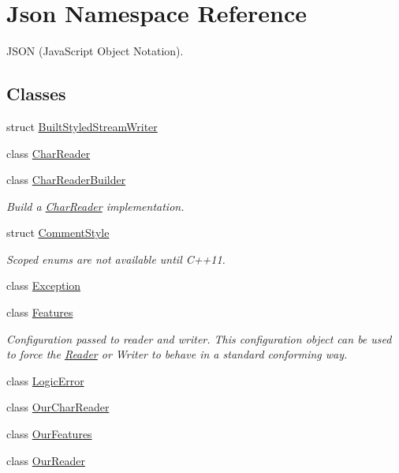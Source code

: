 \hypertarget{namespaceJson}{}\section{Json Namespace Reference}
\label{namespaceJson}


J\+S\+ON (Java\+Script Object Notation).  


\subsection*{Classes}
\begin{DoxyCompactItemize}
\item 
struct \hyperlink{structJson_1_1BuiltStyledStreamWriter}{Built\+Styled\+Stream\+Writer}
\item 
class \hyperlink{classJson_1_1CharReader}{Char\+Reader}
\item 
class \hyperlink{classJson_1_1CharReaderBuilder}{Char\+Reader\+Builder}
\begin{DoxyCompactList}\small\item\em Build a \hyperlink{classJson_1_1CharReader}{Char\+Reader} implementation. \end{DoxyCompactList}\item 
struct \hyperlink{structJson_1_1CommentStyle}{Comment\+Style}
\begin{DoxyCompactList}\small\item\em Scoped enums are not available until C++11. \end{DoxyCompactList}\item 
class \hyperlink{classJson_1_1Exception}{Exception}
\item 
class \hyperlink{classJson_1_1Features}{Features}
\begin{DoxyCompactList}\small\item\em Configuration passed to reader and writer. This configuration object can be used to force the \hyperlink{classJson_1_1Reader}{Reader} or Writer to behave in a standard conforming way. \end{DoxyCompactList}\item 
class \hyperlink{classJson_1_1LogicError}{Logic\+Error}
\item 
class \hyperlink{classJson_1_1OurCharReader}{Our\+Char\+Reader}
\item 
class \hyperlink{classJson_1_1OurFeatures}{Our\+Features}
\item 
class \hyperlink{classJson_1_1OurReader}{Our\+Reader}
\item 

\end{DoxyCompactItemize}
